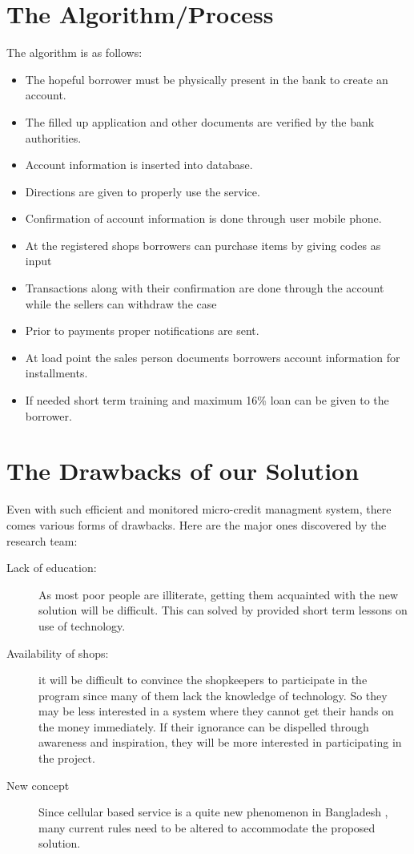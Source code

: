 \documentclass{report}
\begin{document}
\chapter{The Algorithm/Process}
The algorithm is as follows:
\begin{itemize}
\item The hopeful borrower must be physically present in the bank to create an account. 
\item The filled up application and other documents are verified by the bank authorities.
\item Account information is inserted into database.
\item Directions are given to properly use the service.
\item Confirmation of account information is done through user mobile phone.
\item At the registered shops borrowers can purchase items by giving codes as input
\item Transactions along with their confirmation are done through the account while the sellers can withdraw the case
\item Prior to payments proper notifications are sent.
\item At load point the sales person documents borrowers account information for installments.
\item If needed short term training and maximum 16\% loan can be given to the borrower.
\end{itemize}
\newpage

\chapter{The Drawbacks of our Solution}
Even with such efficient and monitored micro-credit managment system, there comes various forms of drawbacks. Here are the major ones discovered by the research team:
\begin{description}
\item[Lack of education:] As most poor people are illiterate, getting them acquainted with the new solution will be difficult. This can solved by provided short term lessons on use of technology.
\item[Availability of shops:] it will be difficult to convince the shopkeepers to participate in the program since many of them lack the knowledge of technology. So they may be less interested in a system where they cannot get their hands on the money immediately. If their ignorance can be dispelled through awareness and inspiration, they will be more interested in participating in the project.
\item[New concept] Since cellular based service is a quite new phenomenon in Bangladesh , many current rules need to be altered to accommodate the proposed solution.

\end{description}
\newpage
\end{document}
